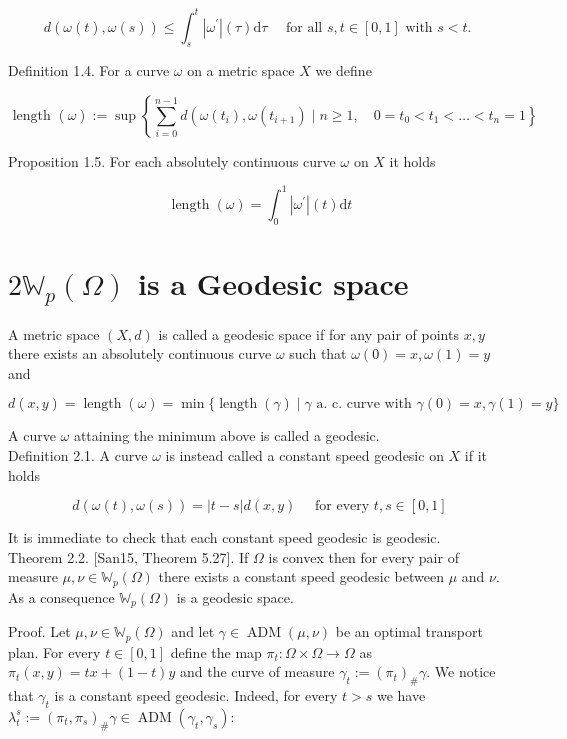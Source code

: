 \documentclass[10pt]{article}
\begin{document}
\[
d(\omega(t), \omega(s)) \leq \int_{s}^{t}\left|\omega^{\prime}\right|(\tau) \mathrm{d} \tau \quad \text { for all } s, t \in[0,1] \text { with } s<t \text {. }
\]

Definition 1.4. For a curve \(\omega\) on a metric space \(X\) we define

\[
\text { length }(\omega):=\sup \left\{\sum_{i=0}^{n-1} d\left(\omega\left(t_{i}\right), \omega\left(t_{i+1}\right) \mid n \geq 1, \quad 0=t_{0}<t_{1}<\ldots<t_{n}=1\right\}\right.
\]

Proposition 1.5. For each absolutely continuous curve \(\omega\) on \(X\) it holds

\[
\operatorname{length}(\omega)=\int_{0}^{1}\left|\omega^{\prime}\right|(t) \mathrm{d} t
\]

\section*{\(2 \mathbb{W}_{p}(\Omega)\) is a Geodesic space}
A metric space \((X, d)\) is called a geodesic space if for any pair of points \(x, y\) there exists an absolutely continuous curve \(\omega\) such that \(\omega(0)=x, \omega(1)=y\) and

\[
d(x, y)=\operatorname{length}(\omega)=\min \{\operatorname{length}(\gamma) \mid \gamma \text { a. c. curve with } \gamma(0)=x, \gamma(1)=y\}
\]

A curve \(\omega\) attaining the minimum above is called a geodesic.\\
Definition 2.1. A curve \(\omega\) is instead called a constant speed geodesic on \(X\) if it holds

\[
d(\omega(t), \omega(s))=|t-s| d(x, y) \quad \text { for every } t, s \in[0,1]
\]

It is immediate to check that each constant speed geodesic is geodesic.\\[0pt]
Theorem 2.2. [San15, Theorem 5.27]. If \(\Omega\) is convex then for every pair of measure \(\mu, \nu \in \mathbb{W}_{p}(\Omega)\) there exists a constant speed geodesic between \(\mu\) and \(\nu\). As a consequence \(\mathbb{W}_{p}(\Omega)\) is a geodesic space.

Proof. Let \(\mu, \nu \in \mathbb{W}_{p}(\Omega)\) and let \(\gamma \in \operatorname{ADM}(\mu, \nu)\) be an optimal transport plan. For every \(t \in[0,1]\) define the map \(\pi_{t}: \Omega \times \Omega \rightarrow \Omega\) as \(\pi_{t}(x, y)=t x+(1-t) y\) and the curve of measure \(\gamma_{t}:=\left(\pi_{t}\right)_{\#} \gamma\). We notice that \(\gamma_{t}\) is a constant speed geodesic. Indeed, for every \(t>s\) we have \(\lambda_{t}^{s}:=\left(\pi_{t}, \pi_{s}\right)_{\#} \gamma \in \operatorname{ADM}\left(\gamma_{t}, \gamma_{s}\right):\)
\end{document}
